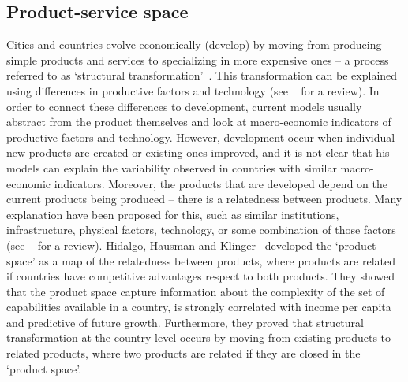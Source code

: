\subsection{Product-service space}
\label{sec:pss}
Cities and countries evolve economically (develop) by moving from producing simple products and services to specializing in more expensive ones -- a process referred to as `structural transformation'~\citep{smith1776, Romer1991,grossman1991,hidalgo2007}.
This transformation can be explained using differences in productive factors and technology (see ~\citep{hausmann2011} for a review).
In order to connect these differences to development, 
current models usually abstract from the product themselves and look at macro-economic indicators of productive factors and technology.
However, development occur when individual new products are created or existing ones improved,
and it is not clear that his models can explain the variability observed in countries with similar macro-economic indicators.
Moreover, the products that are developed depend on the current products being produced -- there is a relatedness between products.
Many explanation have been proposed for this, 
such as similar institutions, infrastructure, physical factors, technology, or some combination of those factors (see ~\cite{hidalgo2007} for a review).
Hidalgo, Hausman and Klinger~\cite{hidalgo2007, hausmann2011, Hausmann2006,hidalgo2009} developed the `product space' as a map of the relatedness between products,
where products are related if countries have competitive advantages respect to both products.
They showed that the product space capture information about the complexity of the set of capabilities available in a country, 
is strongly correlated with income per capita and predictive of future growth.
Furthermore, they proved that structural transformation at the country level occurs by moving from existing products to related products, 
where two products are related if they are closed in the `product space'.

